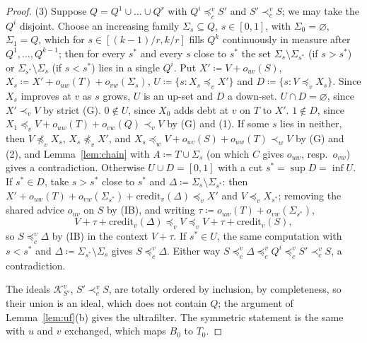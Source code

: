 \documentclass[11pt]{article}
\theoremstyle{definition}\newtheorem{definition}[theorem]{Definition}
\theoremstyle{remark}\newtheorem{remark}[theorem]{Remark}
\newcommand{\cred}{\mathrm{credit}}
\newcommand{\Kid}{\mathcal K}
\begin{document}
\begin{proof}
(3) Suppose $Q=Q^1\cup\dots\cup Q^r$ with $Q^i\preceq^v_cS'$ and
$S'\prec^v_cS$; we may take the $Q^i$ disjoint. Choose an increasing family
$\Sigma_s\subseteq Q$, $s\in[0,1]$, with $\Sigma_0=\varnothing$,
$\Sigma_1=Q$, which for $s\in[(k-1)/r,k/r]$ fills $Q^k$ continuously in
measure after $Q^1,\dots,Q^{k-1}$; then for every $s^*$ and every $s$ close
to $s^*$ the set $\Sigma_s\setminus\Sigma_{s^*}$ (if $s>s^*$) or
$\Sigma_{s^*}\setminus\Sigma_s$ (if $s<s^*$) lies in a single $Q^i$. Put
$X'\coloneqq V+o_{uv}(S)$, $X_s\coloneqq X'+o_{uw}(T)+o_{vw}(\Sigma_s)$,
$U\coloneqq\{s:X_s\preceq_vX'\}$ and $D\coloneqq\{s:V\preceq_vX_s\}$. Since
$X_s$ improves at $v$ as $s$ grows, $U$ is an up-set and $D$ a down-set.
$U\cap D=\varnothing$, since $X'\prec_vV$ by strict (G). $0\notin U$, since
$X_0$ adds debt at $v$ on $T$ to $X'$. $1\notin D$, since
$X_1\preceq_vV+o_{uw}(T)+o_{vw}(Q)\prec_vV$ by (G) and (1). If some $s$ lies
in neither, then $V\not\preceq_vX_s$, $X_s\not\preceq_vX'$, and
$X_s\preceq_wV+o_{uv}(S)+o_{uw}(T)\prec_wV$ by (G) and (2), and
Lemma~\ref{lem:chain} with $A\coloneqq T\cup\Sigma_s$ (on which $C$ gives
$o_{uw}$, resp.\ $o_{vw}$) gives a contradiction. Otherwise $U\cup D=[0,1]$
with a cut $s^*=\sup D=\inf U$. If $s^*\in D$, take $s>s^*$ close to $s^*$
and $\Delta\coloneqq\Sigma_s\setminus\Sigma_{s^*}$: then
$X'+o_{uw}(T)+o_{vw}(\Sigma_{s^*})+\cred_v(\Delta)\preceq_vX'$ and
$V\preceq_vX_{s^*}$; removing the shared advice $o_{uv}$ on $S$ by (IB), and
writing $\tau\coloneqq o_{uw}(T)+o_{vw}(\Sigma_{s^*})$,
\[
 V+\tau+\cred_v(\Delta)\preceq_vV\preceq_vV+\tau+\cred_v(S),
\]
so $S\preceq^v_c\Delta$ by (IB) in the context $V+\tau$. If $s^*\in U$, the
same computation with $s<s^*$ and $\Delta\coloneqq\Sigma_{s^*}\setminus
\Sigma_s$ gives $S\preceq^v_c\Delta$. Either way
$S\preceq^v_c\Delta\preceq^v_cQ^i\preceq^v_cS'\prec^v_cS$, a contradiction.

The ideals $\Kid^v_{S'}$, $S'\prec^v_cS$, are totally ordered by inclusion,
by completeness, so their union is an ideal, which does not contain $Q$; the
argument of Lemma~\ref{lem:uf}(b) gives the ultrafilter. The symmetric
statement is the same with $u$ and $v$ exchanged, which maps $B_0$ to $T_0$.
\end{proof}
\end{document}
